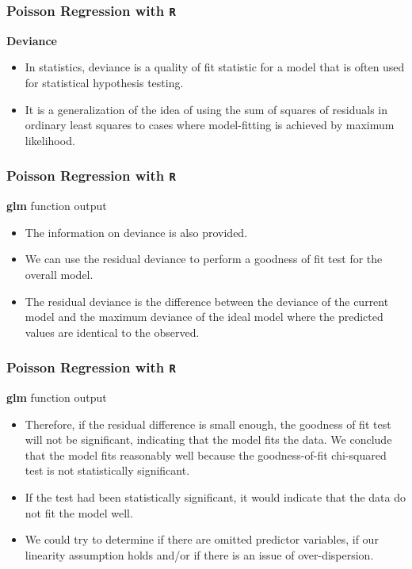 \documentclass[00-GLMregslides.tex]{subfiles}
\begin{document}
\begin{frame}[fragile]
\frametitle{Poisson Regression with \texttt{R}}
\Large 
\textbf{Deviance}
\begin{itemize}
\item In statistics, deviance is a quality of fit statistic for a model that is often used for statistical 
hypothesis testing. 
\item It is a generalization of the idea of using the sum of squares of 
residuals in ordinary least squares to cases where model-fitting is achieved by maximum likelihood.
\end{itemize}
\end{frame}
\begin{frame}[fragile]
\frametitle{Poisson Regression with \texttt{R}}
\Large 
\textbf{glm} function output
\begin{itemize}
\item The information on deviance is also provided. 
\item We can use the residual deviance to perform a goodness of fit test for the overall model. 
\item The residual deviance is the difference between the deviance of the current model and the maximum deviance of the ideal model where the predicted values are identical to the observed. 
\end{itemize}
\end{frame}
\begin{frame}[fragile]
\frametitle{Poisson Regression with \texttt{R}}
\Large 
\textbf{glm} function output
\begin{itemize}
\item Therefore, if the residual difference is small enough, the goodness of fit test will not be significant, indicating that the model fits the data. We conclude that the model fits reasonably well because the goodness-of-fit chi-squared test is not statistically significant. 
\item If the test had been statistically significant, it would indicate that the data do not fit the model well. 
\item We could try to determine if there are omitted predictor variables, if our linearity assumption holds and/or if there is an issue of over-dispersion. 
\end{itemize}
\end{frame}
\end{document}
